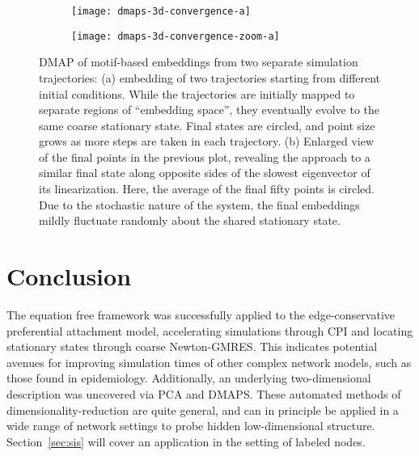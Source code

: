   \begin{figure}
    \vspace{-5mm} \centering
    \begin{subfigure}{0.49\textwidth}
      \centering
      \texttt{[image: dmaps-3d-convergence-a]}
      \subcaption{\label{fig:dmaps-results-regular}}
    \end{subfigure} %
    \begin{subfigure}{0.49\textwidth}
      \centering
      \texttt{[image: dmaps-3d-convergence-zoom-a]}
      \subcaption{\label{fig:dmaps-results-zoom}}
    \end{subfigure}%
    \caption[DMAP of motif-based embeddings when two trajectories are
    sampled]{DMAP of motif-based embeddings from two separate
      simulation trajectories: (a) embedding of two trajectories
      starting from different initial conditions. While the
      trajectories are initially mapped to separate regions of
      ``embedding space'', they eventually evolve to the same coarse
      stationary state.  Final states are circled, and point size
      grows as more steps are taken in each trajectory.  (b) Enlarged
      view of the final points in the previous plot, revealing the
      approach to a similar final state along opposite sides of the
      slowest eigenvector of its linearization.  Here, the average of
      the final fifty points is circled. Due to the stochastic nature
      of the system, the final embeddings mildly fluctuate randomly
      about the shared stationary state. \label{fig:dmaps-results}}
  \end{figure}

  \section{Conclusion}

  The equation free framework was successfully applied to the
  edge-conservative preferential attachment model, accelerating
  simulations through CPI and locating stationary states through
  coarse Newton-GMRES. This indicates potential avenues for improving
  simulation times of other complex network models, such as those
  found in epidemiology.
  Additionally, an underlying two-dimensional description was
  uncovered via PCA and DMAPS. These automated methods of
  dimensionality-reduction are quite general, and can in principle be
  applied in a wide range of network settings to probe hidden
  low-dimensional structure. Section~\ref{sec:sis} will cover an
  application in the setting of labeled nodes.

